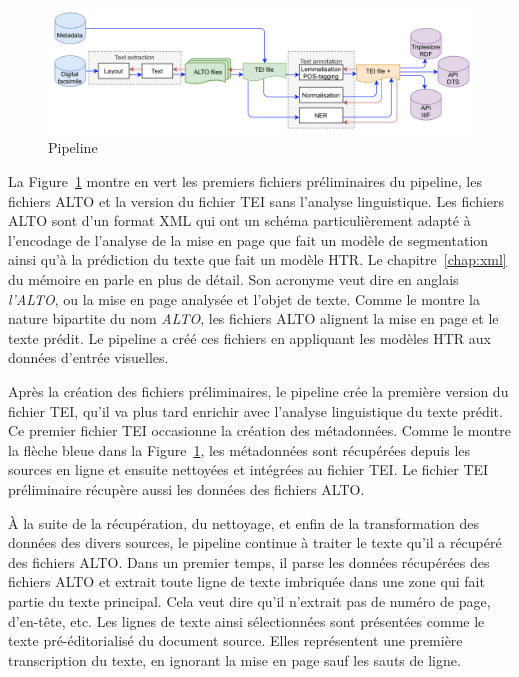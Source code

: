 \documentclass[class=article, crop=false]{standalone}
\begin{document}
\begin{figure}[hbt!]
\includegraphics[width=\textwidth]{../../../images/pipeline.png}
\caption{Pipeline}
\label{fig:pipeline}
\end{figure}

La Figure~\ref{fig:pipeline} montre en vert les premiers fichiers préliminaires du pipeline, les fichiers \acrshort{ALTO} et la version du fichier \acrshort{TEI} sans l'analyse linguistique. Les fichiers \acrshort{ALTO} sont d'un format \acrshort{XML} qui ont un schéma particulièrement adapté à l'encodage de l'analyse de la mise en page que fait un modèle de segmentation ainsi qu'à la prédiction du texte que fait un modèle \acrshort{HTR}. Le chapitre~\ref{chap:xml} du mémoire en parle en plus de détail. Son acronyme veut dire en anglais \textit{l'\acrlong{ALTO}}, ou la mise en page analysée et l'objet de texte. Comme le montre la nature bipartite du nom \textit{\acrlong{ALTO}}, les fichiers \acrshort{ALTO} alignent la mise en page et le texte prédit. Le pipeline a créé  ces fichiers en appliquant les modèles \acrshort{HTR} aux données d'entrée visuelles.

Après la création des fichiers préliminaires, le pipeline crée la première version du fichier \acrshort{TEI}, qu'il va plus tard enrichir avec l'analyse linguistique du texte prédit. Ce premier fichier \acrshort{TEI} occasionne la création des métadonnées. Comme le montre la flèche bleue dans la Figure~\ref{fig:pipeline}, les métadonnées sont récupérées depuis les sources en ligne et ensuite nettoyées et intégrées au fichier \acrshort{TEI}. Le fichier \acrshort{TEI} préliminaire récupère aussi les données des fichiers \acrshort{ALTO}.

À la suite de la récupération, du nettoyage, et enfin de la transformation des données des divers sources, le pipeline continue à traiter le texte qu'il a récupéré des fichiers \acrshort{ALTO}. Dans un premier temps, il parse les données récupérées des fichiers \acrshort{ALTO} et extrait toute ligne de texte imbriquée dans une zone qui fait partie du texte principal. Cela veut dire qu'il n'extrait pas de numéro de page, d'en-tête, etc. Les lignes de texte ainsi sélectionnées sont présentées comme le texte pré-éditorialisé du document source. Elles représentent une première transcription du texte, en ignorant la mise en page sauf les sauts de ligne.
\end{document}
